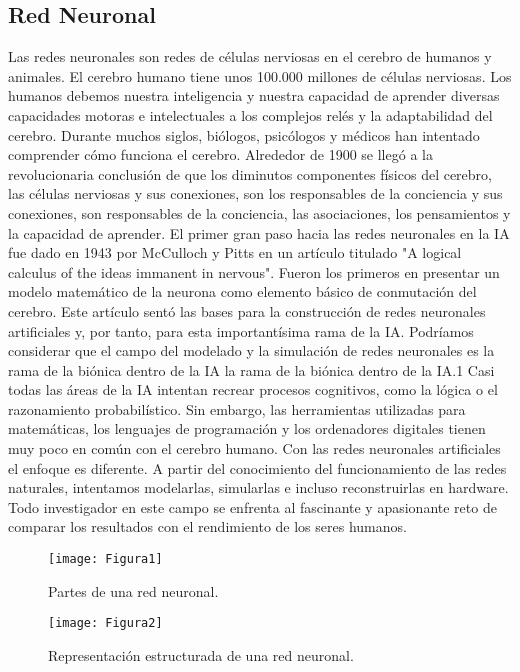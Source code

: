 \documentclass[a4paper,
               ]{jacow}
\begin{document}
\subsection{Red Neuronal}
Las redes neuronales son redes de células nerviosas en el cerebro de humanos y animales. El cerebro humano tiene unos 100.000 millones de células nerviosas. Los humanos debemos nuestra inteligencia y nuestra capacidad de aprender diversas capacidades motoras e intelectuales a los complejos relés y la adaptabilidad del cerebro. Durante muchos siglos, biólogos, psicólogos y médicos han intentado comprender cómo funciona el cerebro. Alrededor de 1900 se llegó a la revolucionaria conclusión de que los diminutos componentes físicos del cerebro, las células nerviosas y sus conexiones, son los responsables de la conciencia y sus conexiones, son responsables de la conciencia, las asociaciones, los pensamientos y la capacidad de aprender. El primer gran paso hacia las redes neuronales en la IA fue dado en 1943 por McCulloch y Pitts en un artículo titulado "A logical calculus of the ideas immanent in nervous". Fueron los primeros en presentar un modelo matemático de la neurona como elemento básico de conmutación del cerebro. Este artículo sentó las bases para la construcción de redes neuronales artificiales y, por tanto, para esta importantísima rama
de la IA.
Podríamos considerar que el campo del modelado y la simulación de redes neuronales es la rama de la biónica dentro de la IA la rama de la biónica dentro de la IA.1 Casi todas las áreas de la IA intentan recrear procesos cognitivos, como la lógica o el razonamiento probabilístico. Sin embargo, las herramientas utilizadas para matemáticas, los lenguajes de programación y los ordenadores digitales tienen muy poco en común con el cerebro humano. Con las redes neuronales artificiales el enfoque es diferente. A partir del conocimiento del funcionamiento de las redes naturales, intentamos modelarlas, simularlas e incluso reconstruirlas en hardware. Todo investigador en este campo se enfrenta al fascinante y apasionante reto de comparar los resultados con el rendimiento de los seres humanos.

\begin{figure}[!htb]
   \centering
   \captionsetup{justification=centering}
    \texttt{[image: Figura1]}
    \caption{Partes de una red neuronal.}
\end{figure}

\begin{figure}[!htb]
   \centering
   \captionsetup{justification=centering}
    \texttt{[image: Figura2]}
    \caption{Representación estructurada de una red neuronal.}
\end{figure}
\end{document}
